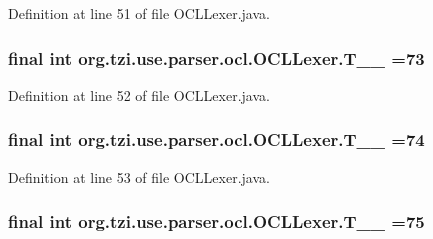 Definition at line 51 of file O\-C\-L\-Lexer.\-java.

\hypertarget{classorg_1_1tzi_1_1use_1_1parser_1_1ocl_1_1_o_c_l_lexer_a2d20a74d05eff4a38af27082bb1231be}{
\subsubsection[{T\-\_\-\-\_\-73}]{\setlength{\rightskip}{0pt plus 5cm}final int org.\-tzi.\-use.\-parser.\-ocl.\-O\-C\-L\-Lexer.\-T\-\_\-\-\_ =73\hspace{0.3cm}{\ttfamily [static]}}}\label{classorg_1_1tzi_1_1use_1_1parser_1_1ocl_1_1_o_c_l_lexer_a2d20a74d05eff4a38af27082bb1231be}


Definition at line 52 of file O\-C\-L\-Lexer.\-java.

\hypertarget{classorg_1_1tzi_1_1use_1_1parser_1_1ocl_1_1_o_c_l_lexer_a616ddfa7822fb0f4a673943bd8e09ed7}{
\subsubsection[{T\-\_\-\-\_\-74}]{\setlength{\rightskip}{0pt plus 5cm}final int org.\-tzi.\-use.\-parser.\-ocl.\-O\-C\-L\-Lexer.\-T\-\_\-\-\_ =74\hspace{0.3cm}{\ttfamily [static]}}}\label{classorg_1_1tzi_1_1use_1_1parser_1_1ocl_1_1_o_c_l_lexer_a616ddfa7822fb0f4a673943bd8e09ed7}


Definition at line 53 of file O\-C\-L\-Lexer.\-java.

\hypertarget{classorg_1_1tzi_1_1use_1_1parser_1_1ocl_1_1_o_c_l_lexer_a0254d802a419f5eef2f044eb2fae3b0b}{
\subsubsection[{T\-\_\-\-\_\-75}]{\setlength{\rightskip}{0pt plus 5cm}final int org.\-tzi.\-use.\-parser.\-ocl.\-O\-C\-L\-Lexer.\-T\-\_\-\-\_ =75\hspace{0.3cm}{\ttfamily [static]}}}\label{classorg_1_1tzi_1_1use_1_1parser_1_1ocl_1_1_o_c_l_lexer_a0254d802a419f5eef2f044eb2fae3b0b}


